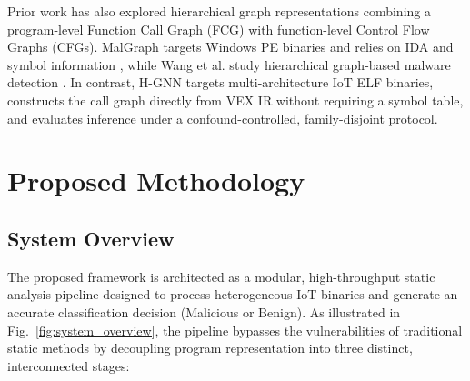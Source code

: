 \documentclass{llncs}
\begin{document}
Prior work has also explored hierarchical graph representations
combining a program-level Function Call Graph (FCG) with function-level
Control Flow Graphs (CFGs). MalGraph targets Windows PE binaries and relies
on IDA and symbol information \cite{malgraph2022}, while Wang et al. study
hierarchical graph-based malware detection \cite{wang2021hier}. In contrast,
H-GNN targets multi-architecture IoT ELF binaries, constructs the call graph
directly from VEX IR without requiring a symbol table, and evaluates inference
under a confound-controlled, family-disjoint protocol.


\section{Proposed Methodology}
\label{sec:methodology}

\subsection{System Overview}
The proposed  framework is architected as a modular, high-throughput static analysis pipeline designed to process heterogeneous IoT binaries and generate an accurate classification decision (Malicious or Benign). As illustrated in Fig.~\ref{fig:system_overview}, the pipeline bypasses the vulnerabilities of traditional static methods by decoupling program representation into three distinct, interconnected stages:
\end{document}
